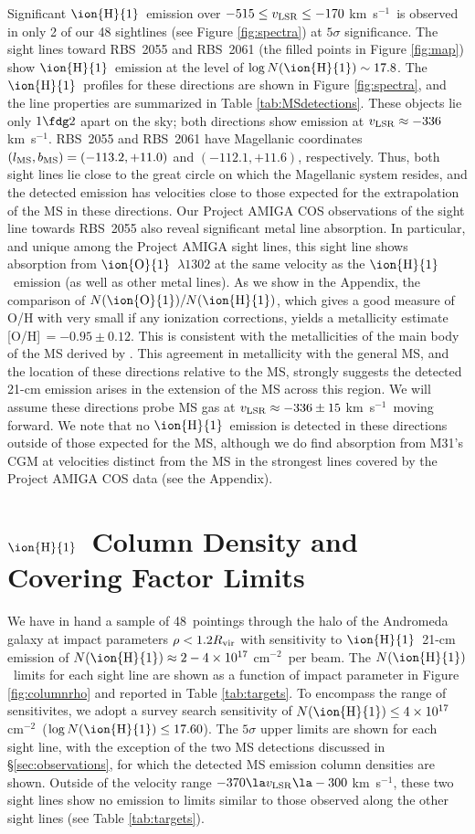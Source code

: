 \documentclass[12pt,preprint]{aastex6}
\newcommand{\qsonumber}{48}
\newcommand{\MSmetallicity}{\ensuremath{-0.95\pm0.12}}
\newcommand{\HI}{\ensuremath{\mbox{\ion{H}{1}}}}
\newcommand{\OI}{\ensuremath{\mbox{\ion{O}{1}}}}
\newcommand{\NHI}{\ensuremath{N(\mbox{\ion{H}{1}})}\relax}
\newcommand{\logNHI}{\ensuremath{\log N(\mbox{\ion{H}{1}})}\relax}
\newcommand{\Rvir}{\ensuremath{R_{\rm vir}}\relax}
\newcommand{\column}{cm$^{-2}$}
\newcommand{\kms}{km~s$^{-1}$}
\newcommand{\vlsr}{\ensuremath{v_{\rm LSR}\relax}}
\begin{document}
Significant \HI\ emission over $-515 \le \vlsr \le -170$ \kms\ is
observed in only 2 of our 48 sightlines (see Figure \ref{fig:spectra})
at $5\sigma$ significance. The sight lines toward RBS~2055 and
RBS~2061 (the filled points in Figure \ref{fig:map}) show \HI\
emission at the level of $\logNHI \sim 17.8$. The \HI\ profiles for
these directions are shown in Figure \ref{fig:spectra}, and the line
properties are summarized in Table \ref{tab:MSdetections}. These
objects lie only $1\fdg2$ apart on the sky; both directions show
emission at $\vlsr \approx -336$ \kms. RBS~2055 and RBS~2061 have
Magellanic coordinates $(l_{\rm MS}, b_{\rm MS}) = (-113.2, +11.0)$
and $(-112.1, +11.6)$, respectively. Thus, both sight lines lie close
to the great circle on which the Magellanic system resides, and the
detected emission has velocities close to those expected for the
extrapolation of the MS in these directions. Our Project AMIGA COS
observations of the sight line towards RBS~2055 also reveal
significant metal line absorption. In particular, and unique among the
Project AMIGA sight lines, this sight line shows absorption from \OI\
$\lambda1302$ at the same velocity as the \HI\ emission (as well as
other metal lines). As we show in the Appendix, the comparison of
$N(\mbox{\OI}) / \NHI$, which gives a good measure of O/H with very
small if any ionization corrections, yields a metallicity estimate
[O/H]$\, = \MSmetallicity$. This is consistent with the metallicities
of the main body of the MS derived by \citet{fox2010, fox2013}.  This
agreement in metallicity with the general MS, and the location of
these directions relative to the MS, strongly suggests the detected
21-cm emission arises in the extension of the MS across this
region. We will assume these directions probe MS gas at
$\vlsr \approx -336\pm15$ \kms\ moving forward. We note that no \HI\
emission is detected in these directions outside of those expected for
the MS, although we do find absorption from M31's CGM at velocities
distinct from the MS in the strongest lines covered by the Project
AMIGA COS data (see the Appendix).

\section{\HI\ Column Density and Covering Factor Limits}
\label{sec:coveringfactor}

We have in hand a sample of \qsonumber\ pointings through the halo of
the Andromeda galaxy at impact parameters $\rho < 1.2 \Rvir$ with
sensitivity to \HI\ 21-cm emission of
$\NHI \approx 2 - 4\times10^{17}$ \column\ per beam. The \NHI\ limits
for each sight line are shown as a function of impact parameter in
Figure \ref{fig:columnrho} and reported in Table \ref{tab:targets}. To
encompass the range of sensitivites, we adopt a survey search
sensitivity of $\NHI \le 4\times10^{17}$ \column\
($\logNHI \le 17.60$).  The $5\sigma$ upper limits are shown for each
sight line, with the exception of the two MS detections discussed in
\S \ref{sec:observations}, for which the detected MS emission column
densities are shown. Outside of the velocity range
$-370 \la \vlsr \la -300$ \kms, these two sight lines show no emission
to limits similar to those observed along the other sight lines (see
Table \ref{tab:targets}).
\end{document}
